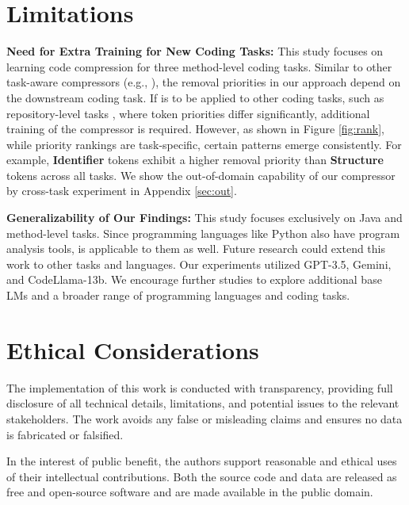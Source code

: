 
\section{Limitations}
\textbf{Need for Extra Training for New Coding Tasks:} This study focuses on learning code compression for three method-level coding tasks. Similar to other task-aware compressors (e.g., \citealp{longllmlingua}), the removal priorities in our approach depend on the downstream coding task. If \ourtool{} is to be applied to other coding tasks, such as repository-level tasks \citep{repo}, where token priorities differ significantly, additional training of the compressor is required. However, as shown in Figure \ref{fig:rank}, while priority rankings are task-specific, certain patterns emerge consistently. For example, \textbf{Identifier} tokens exhibit a higher removal priority than \textbf{Structure} tokens across all tasks. We show the out-of-domain capability of our compressor by cross-task experiment in Appendix \ref{sec:out}.

\textbf{Generalizability of Our Findings:}
This study focuses exclusively on Java and method-level tasks. Since programming languages like Python also have program analysis tools, \ourtool{} is applicable to them as well. Future research could extend this work to other tasks and languages. Our experiments utilized GPT-3.5, Gemini, and CodeLlama-13b. We encourage further studies to explore additional base LMs and a broader range of programming languages and coding tasks.

\section{Ethical Considerations}
The implementation of this work is conducted with transparency, providing full disclosure of all technical details, limitations, and potential issues to the relevant stakeholders. The work avoids any false or misleading claims and ensures no data is fabricated or falsified.

In the interest of public benefit, the authors support reasonable and ethical uses of their intellectual contributions. Both the source code and data are released as free and open-source software and are made available in the public domain.  